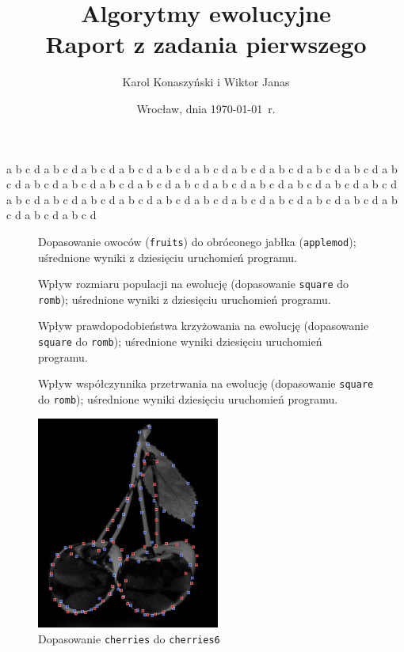 \documentclass[a4paper,12pt,leqno]{article}
\title{\textbf{Algorytmy ewolucyjne}\\
       {\Large Raport z zadania pierwszego}\\[-1ex]}
\author{Karol Konaszyński i Wiktor Janas}
\date{Wrocław, dnia \today\ r.}
\begin{document}
\maketitle
a b c d a b c d a b c d a b c d a b c d a b c d a b c d a b c d a b c d a b c d a b c d a b c d a b c d a b c d a b c d a b c d a b c d 
a b c d a b c d a b c d a b c d a b c d a b c d a b c d a b c d a b c d a b c d a b c d a b c d a b c d a b c d a b c d a b c d a b c d 

\begin{figure}\centering
\footnotesize\vspace{-2em}
\normalsize\caption{Dopasowanie owoców (\texttt{fruits}) do obróconego jabłka (\texttt{applemod}); uśrednione wyniki z dziesięciu uruchomień programu.}
\end{figure} 

\begin{figure}\centering
\footnotesize\vspace{-2em}
\normalsize\caption{Wpływ rozmiaru populacji na ewolucję (dopasowanie \texttt{square} do \texttt{romb}); uśrednione wyniki z dziesięciu uruchomień programu.}
\end{figure}
\begin{figure}\centering
\footnotesize\vspace{-2em}
\normalsize\caption{Wpływ prawdopodobieństwa krzyżowania na ewolucję (dopasowanie \texttt{square} do \texttt{romb}); uśrednione wyniki dziesięciu uruchomień programu.}
\end{figure}
\begin{figure}\centering
\footnotesize\vspace{-2em}
\normalsize\caption{Wpływ współczynnika przetrwania na ewolucję (dopasowanie \texttt{square} do \texttt{romb}); uśrednione wyniki dziesięciu uruchomień programu.}
\end{figure}

\begin{figure}\centering
\includegraphics[width=6cm,keepaspectratio=true]{./cherries-match.png}
\caption{Dopasowanie \texttt{cherries} do \texttt{cherries6}}
\end{figure}
\end{document}
